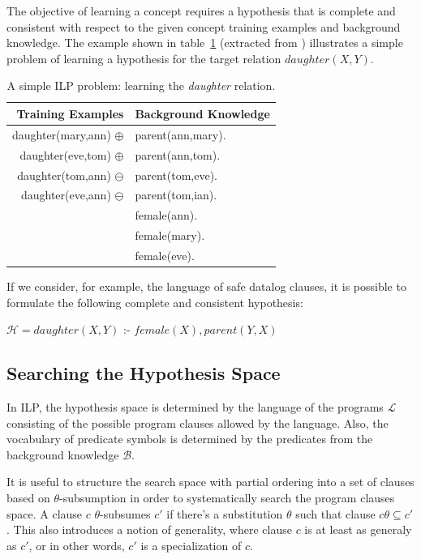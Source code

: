The objective of learning a concept requires a hypothesis that is complete and consistent with respect to the given
concept training examples and background knowledge. The example shown in table~\ref{tab:ilpExample} (extracted from
\cite{DBLP:journals/ml/LavracD96}) illustrates a simple problem of learning a hypothesis for the target relation
$daughter(X,Y)$.

\begin{table}[h!]
\label{tab:ilpExample}
\caption{A simple ILP problem: learning the \emph{daughter} relation.}
  \begin{center}
      \begin{tabular}{ r | l }
      \toprule
      \textbf{Training Examples} & \textbf{Background Knowledge}\\
      \midrule
      daughter(mary,ann) $\oplus$	& parent(ann,mary).	\\
      daughter(eve,tom) $\oplus$	& parent(ann,tom).	\\
      daughter(tom,ann) $\ominus$ 	& parent(tom,eve).	\\
      daughter(eve,ann) $\ominus$	& parent(tom,ian).	\\
					& female(ann).		\\
					& female(mary).		\\
					& female(eve).		\\
      \bottomrule
      \end{tabular}
  \end{center}
\end{table}

If we consider, for example, the language of safe datalog clauses, it is possible to formulate the following complete
and consistent hypothesis:

\begin{center}
  $\mathcal{H} = daughter(X,Y)$ :- $female(X),parent(Y,X)$ 
\end{center}

\subsection{Searching the Hypothesis Space}

In ILP, the hypothesis space is determined by the language of the programs $\mathcal{L}$ consisting of the possible
program clauses allowed by the language. Also, the vocabulary of predicate symbols is determined by the predicates
from
the background knowledge $\mathcal{B}$.

It is useful to structure the search space with partial ordering into a set of clauses based on $\theta$-subsumption
in
order to systematically search the program clauses space. A clause $c$ $\theta$-subsumes $c'$ if there's a
substitution $\theta$ such that clause $c\theta \subseteq c'$. This also introduces a notion of generality, where
clause $c$ is at least as generaly as $c'$, or in other words, $c'$ is a specialization of $c$.

